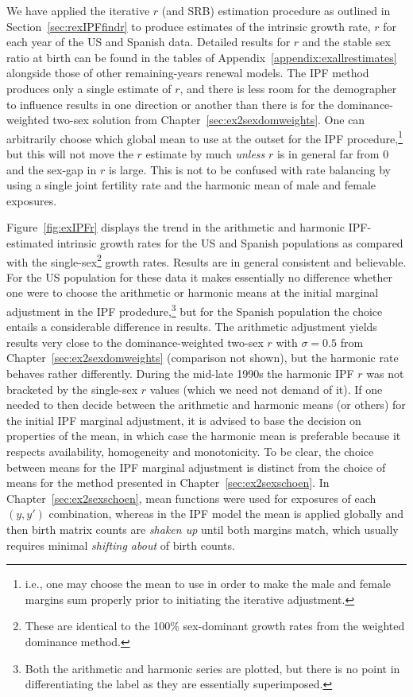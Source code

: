 \FloatBarrier

We have applied the iterative $r$ (and SRB) estimation procedure as outlined in
Section~\ref{sec:rexIPFfindr} to produce estimates of the intrinsic growth rate,
$r$ for each year of the US and Spanish data. Detailed results for $r$ and
the stable sex ratio at birth can be found in the tables of
Appendix~\ref{appendix:exallrestimates} alongside those of other remaining-years 
renewal models. The IPF method produces only a single
estimate of $r$, and there is less room for the demographer to influence 
results in one direction or another than there is for the dominance-weighted 
two-sex solution from Chapter~\ref{sec:ex2sexdomweights}. One can
arbitrarily choose which global mean to use at the outset for the IPF
procedure,\footnote{i.e., one may choose the mean to use in order to make the
male and female margins sum properly prior to initiating the iterative adjustment.}
but this will not move the $r$ estimate by much \textit{unless} $r$ is in
general far from 0 and the sex-gap in $r$ is large. This is not to be confused
with rate balancing by using a single joint fertility rate and the harmonic 
mean of male and female exposures.

Figure~\ref{fig:exIPFr} displays the trend in the arithmetic and harmonic
IPF-estimated intrinsic growth rates for the US and Spanish populations as
compared with the single-sex\footnote{These are identical to the
100\% sex-dominant growth rates from the weighted dominance method.} growth
rates. Results are in general consistent and believable. For the US population 
for these data it makes essentially no difference whether one were to choose the
 arithmetic or harmonic means at the initial marginal adjustment in the IPF 
 prodedure,\footnote{Both the arithmetic
and harmonic series are plotted, but there is no point in differentiating the
label as they are essentially superimposed.} but for the Spanish population the
choice entails a considerable difference in results. The arithmetic
adjustment yields results very close to the dominance-weighted two-sex $r$ with
$\sigma = 0.5$ from Chapter~\ref{sec:ex2sexdomweights} (comparison not shown),
but the harmonic rate behaves rather differently. During the mid-late 1990s the
harmonic IPF $r$ was not bracketed by the single-sex $r$ values (which we
need not demand of it). If one needed to then decide between the arithmetic and
harmonic means (or others) for the initial IPF marginal adjustment, it is
advised to base the decision on properties of the mean, in which case the
harmonic mean is preferable because it respects availability, homogeneity and
monotonicity. To be clear, the choice between means for the IPF marginal
adjustment is distinct from the choice of means for the method presented in
Chapter~\ref{sec:ex2sexschoen}. In Chapter~\ref{sec:ex2sexschoen}, mean
functions were used for exposures of each $(y,y')$ combination, whereas in the
IPF model the mean is applied globally and then birth matrix counts are \textit{shaken up}
until both margins match, which usually requires minimal \textit{shifting about}
of birth counts.

